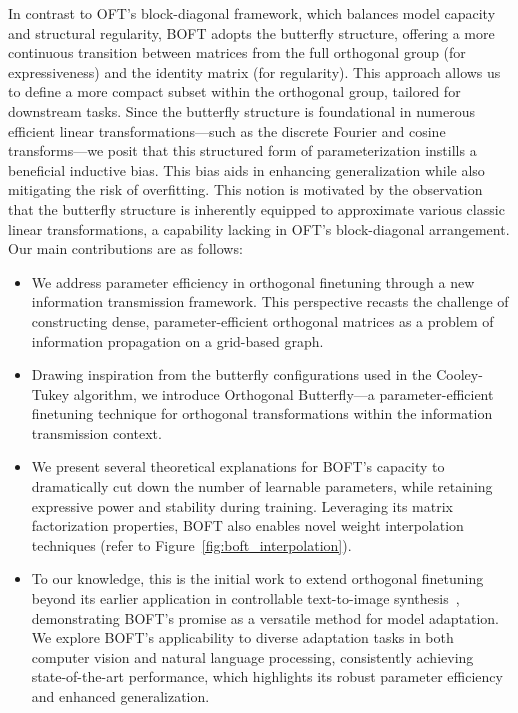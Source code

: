 In contrast to OFT's block-diagonal framework, which balances model capacity and structural regularity, BOFT adopts the butterfly structure, offering a more continuous transition between matrices from the full orthogonal group (for expressiveness) and the identity matrix (for regularity). This approach allows us to define a more compact subset within the orthogonal group, tailored for downstream tasks. Since the butterfly structure is foundational in numerous efficient linear transformations—such as the discrete Fourier and cosine transforms—we posit that this structured form of parameterization instills a beneficial inductive bias. This bias aids in enhancing generalization while also mitigating the risk of overfitting. This notion is motivated by the observation that the butterfly structure is inherently equipped to approximate various classic linear transformations, a capability lacking in OFT’s block-diagonal arrangement. Our main contributions are as follows:

\begin{itemize}[leftmargin=*,nosep]
    \item We address parameter efficiency in orthogonal finetuning through a new information transmission framework. This perspective recasts the challenge of constructing dense, parameter-efficient orthogonal matrices as a problem of information propagation on a grid-based graph.
    \item Drawing inspiration from the butterfly configurations used in the Cooley-Tukey algorithm, we introduce Orthogonal Butterfly—a parameter-efficient finetuning technique for orthogonal transformations within the information transmission context.
    \item We present several theoretical explanations for BOFT's capacity to dramatically cut down the number of learnable parameters, while retaining expressive power and stability during training. Leveraging its matrix factorization properties, BOFT also enables novel weight interpolation techniques (refer to Figure~\ref{fig:boft_interpolation}).
    \item To our knowledge, this is the initial work to extend orthogonal finetuning beyond its earlier application in controllable text-to-image synthesis~\cite{qiu2023controlling}, demonstrating BOFT's promise as a versatile method for model adaptation. We explore BOFT’s applicability to diverse adaptation tasks in both computer vision and natural language processing, consistently achieving state-of-the-art performance, which highlights its robust parameter efficiency and enhanced generalization.
\end{itemize}

